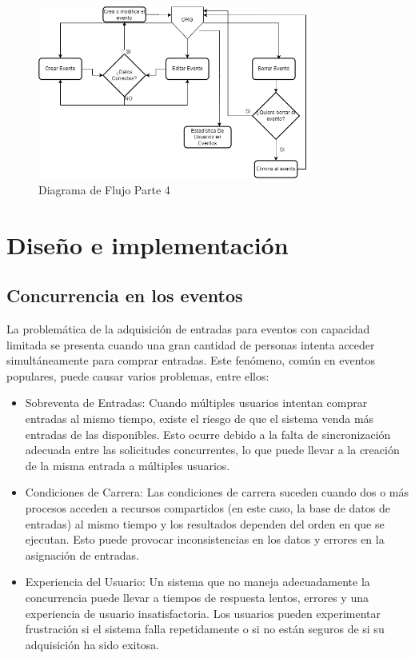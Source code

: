 \newpage
\begin{figure}[h]
    \centering
    \includegraphics[width=0.8\textwidth]{Org.png} 
    \caption{Diagrama de Flujo Parte 4}
    \label{fig:flujoEvs3}
\end{figure}
\section{Diseño e implementación}    

\subsection{Concurrencia en los eventos}
\label{sec:concurrencia}
La problemática de la adquisición de entradas para eventos con capacidad limitada se presenta cuando una gran cantidad de personas intenta acceder simultáneamente
para comprar entradas. Este fenómeno, común en eventos populares, puede causar varios problemas, entre ellos:
\begin{itemize}
    \item Sobreventa de Entradas: Cuando múltiples usuarios intentan comprar entradas al mismo tiempo, existe el riesgo de que el sistema venda más entradas de las disponibles.
    Esto ocurre debido a la falta de sincronización adecuada entre las solicitudes concurrentes, lo que puede llevar a la creación de la misma entrada a múltiples usuarios.
    \item Condiciones de Carrera: Las condiciones de carrera suceden cuando dos o más procesos acceden a recursos compartidos (en este caso, la base de datos de entradas) al mismo
    tiempo y los resultados dependen del orden en que se ejecutan. Esto puede provocar inconsistencias en los datos y errores en la asignación de entradas.
    \item Experiencia del Usuario: Un sistema que no maneja adecuadamente la concurrencia puede llevar a tiempos de respuesta lentos, errores y una experiencia de usuario
    insatisfactoria. Los usuarios pueden experimentar frustración si el sistema falla repetidamente o si no están seguros de si su adquisición ha sido exitosa.   
\end{itemize}

